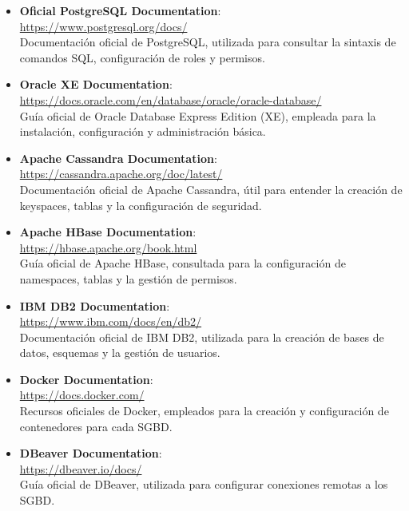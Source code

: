 \documentclass{article}
\begin{document}
\begin{itemize}
    \item \textbf{Oficial PostgreSQL Documentation}: \\
    \url{https://www.postgresql.org/docs/} \\
    Documentación oficial de PostgreSQL, utilizada para consultar la sintaxis de comandos SQL, configuración de roles y permisos.

    \item \textbf{Oracle XE Documentation}: \\
    \url{https://docs.oracle.com/en/database/oracle/oracle-database/} \\
    Guía oficial de Oracle Database Express Edition (XE), empleada para la instalación, configuración y administración básica.

    \item \textbf{Apache Cassandra Documentation}: \\
    \url{https://cassandra.apache.org/doc/latest/} \\
    Documentación oficial de Apache Cassandra, útil para entender la creación de keyspaces, tablas y la configuración de seguridad.

    \item \textbf{Apache HBase Documentation}: \\
    \url{https://hbase.apache.org/book.html} \\
    Guía oficial de Apache HBase, consultada para la configuración de namespaces, tablas y la gestión de permisos.

    \item \textbf{IBM DB2 Documentation}: \\
    \url{https://www.ibm.com/docs/en/db2/} \\
    Documentación oficial de IBM DB2, utilizada para la creación de bases de datos, esquemas y la gestión de usuarios.

    \item \textbf{Docker Documentation}: \\
    \url{https://docs.docker.com/} \\
    Recursos oficiales de Docker, empleados para la creación y configuración de contenedores para cada SGBD.

    \item \textbf{DBeaver Documentation}: \\
    \url{https://dbeaver.io/docs/} \\
    Guía oficial de DBeaver, utilizada para configurar conexiones remotas a los SGBD.


\end{itemize}
\end{document}
